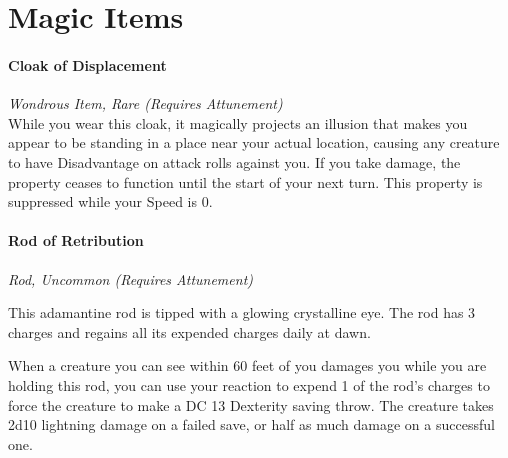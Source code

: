 \documentclass[letterpaper,openany,oneside,twocolumn]{book}
\begin{document}
\part*{Magic Items}
\subsection*{Cloak of Displacement}
\textit{Wondrous Item, Rare (Requires Attunement)}\\
{\entryfont While you wear this cloak, it magically projects an illusion that makes you appear to be standing in a place near your actual location, causing any creature to have Disadvantage on attack rolls against you. If you take damage, the property ceases to function until the start of your next turn. This property is suppressed while your Speed is 0.}
\subsection*{Rod of Retribution}
\textit{Rod, Uncommon (Requires Attunement)}\\
{\entryfont This adamantine rod is tipped with a glowing crystalline eye. The rod has 3 charges and regains all its expended charges daily at dawn.

When a creature you can see within 60 feet of you damages you while you are holding this rod, you can use your reaction to expend 1 of the rod's charges to force the creature to make a DC 13 Dexterity saving throw. The creature takes 2d10 lightning damage on a failed save, or half as much damage on a successful one.}
\end{document}
